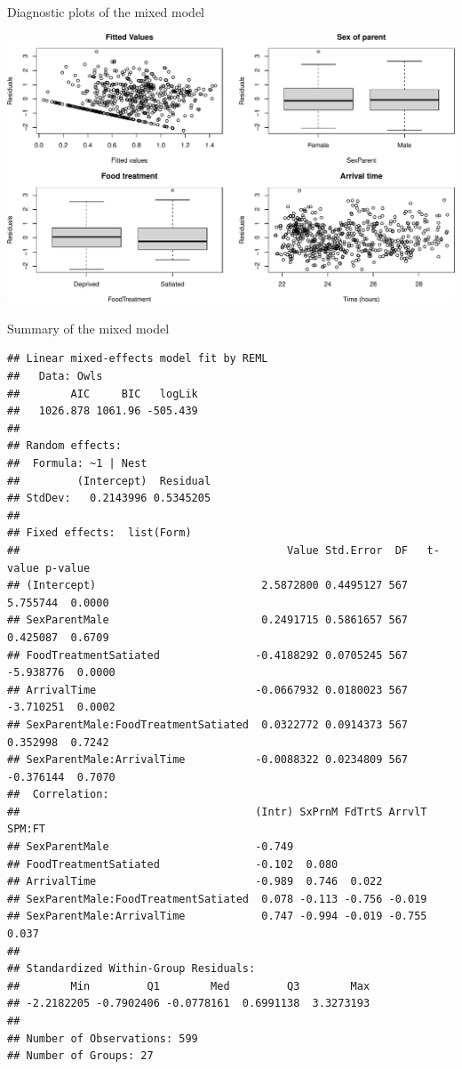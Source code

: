 \documentclass[
  ignorenonframetext,
]{beamer}
\begin{document}
\begin{frame}{Diagnostic plots of the mixed model}
\protect\hypertarget{diagnostic-plots-of-the-mixed-model}{}
\scriptsize

\includegraphics{mixed_models_files/figure-beamer/unnamed-chunk-16-1.pdf}
\end{frame}

\begin{frame}[fragile]{Summary of the mixed model}
\protect\hypertarget{summary-of-the-mixed-model}{}
\tiny

\begin{verbatim}
## Linear mixed-effects model fit by REML
##   Data: Owls 
##        AIC     BIC   logLik
##   1026.878 1061.96 -505.439
## 
## Random effects:
##  Formula: ~1 | Nest
##         (Intercept)  Residual
## StdDev:   0.2143996 0.5345205
## 
## Fixed effects:  list(Form) 
##                                          Value Std.Error  DF   t-value p-value
## (Intercept)                          2.5872800 0.4495127 567  5.755744  0.0000
## SexParentMale                        0.2491715 0.5861657 567  0.425087  0.6709
## FoodTreatmentSatiated               -0.4188292 0.0705245 567 -5.938776  0.0000
## ArrivalTime                         -0.0667932 0.0180023 567 -3.710251  0.0002
## SexParentMale:FoodTreatmentSatiated  0.0322772 0.0914373 567  0.352998  0.7242
## SexParentMale:ArrivalTime           -0.0088322 0.0234809 567 -0.376144  0.7070
##  Correlation: 
##                                     (Intr) SxPrnM FdTrtS ArrvlT SPM:FT
## SexParentMale                       -0.749                            
## FoodTreatmentSatiated               -0.102  0.080                     
## ArrivalTime                         -0.989  0.746  0.022              
## SexParentMale:FoodTreatmentSatiated  0.078 -0.113 -0.756 -0.019       
## SexParentMale:ArrivalTime            0.747 -0.994 -0.019 -0.755  0.037
## 
## Standardized Within-Group Residuals:
##        Min         Q1        Med         Q3        Max 
## -2.2182205 -0.7902406 -0.0778161  0.6991138  3.3273193 
## 
## Number of Observations: 599
## Number of Groups: 27
\end{verbatim}
\end{frame}
\end{document}

